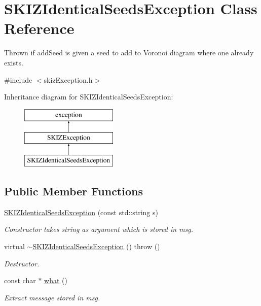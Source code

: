 \hypertarget{classSKIZIdenticalSeedsException}{}\section{S\+K\+I\+Z\+Identical\+Seeds\+Exception Class Reference}
\label{classSKIZIdenticalSeedsException}


Thrown if add\+Seed is given a seed to add to Voronoi diagram where one already exists.  




{\ttfamily \#include $<$skiz\+Exception.\+h$>$}

Inheritance diagram for S\+K\+I\+Z\+Identical\+Seeds\+Exception\+:\begin{figure}[H]
\begin{center}
\leavevmode
\includegraphics[height=3.000000cm]{classSKIZIdenticalSeedsException}
\end{center}
\end{figure}
\subsection*{Public Member Functions}
\begin{DoxyCompactItemize}
\item 
\mbox{\hyperlink{classSKIZIdenticalSeedsException_a776554e938f17373b9de355c81eb78e3}{S\+K\+I\+Z\+Identical\+Seeds\+Exception}} (const std\+::string s)
\begin{DoxyCompactList}\small\item\em Constructor takes string as argument which is stored in msg. \end{DoxyCompactList}\item 
virtual \mbox{\hyperlink{classSKIZIdenticalSeedsException_addce88717ce4fe89ef5d431e7fdff84b}{$\sim$\+S\+K\+I\+Z\+Identical\+Seeds\+Exception}} ()  throw ()
\begin{DoxyCompactList}\small\item\em Destructor. \end{DoxyCompactList}\item 
const char $\ast$ \mbox{\hyperlink{classSKIZIdenticalSeedsException_a1edd2deac7bafc875e21c67d114494ae}{what}} ()
\begin{DoxyCompactList}\small\item\em Extract message stored in msg. \end{DoxyCompactList}\end{DoxyCompactItemize}


